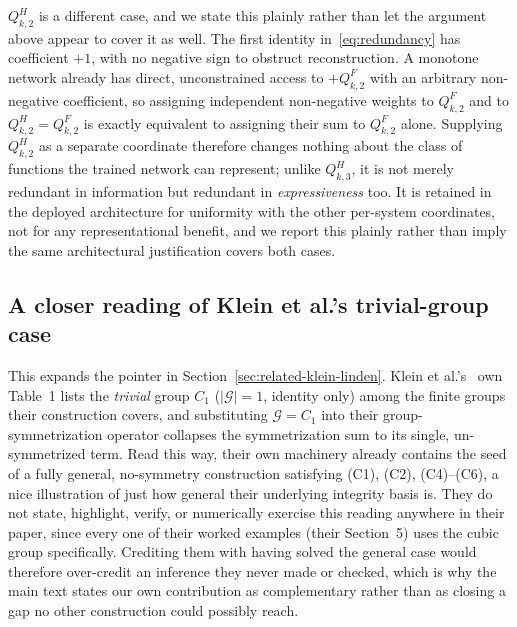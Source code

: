 \documentclass[10pt,a4paper]{article}
\begin{document}
$Q_{k,2}^H$ is a different case, and we state this plainly rather than
let the argument above appear to cover it as well. The first identity
in~\eqref{eq:redundancy} has coefficient $+1$, with no negative sign
to obstruct reconstruction. A monotone network already has direct,
unconstrained access to $+Q_{k,2}^F$ with an arbitrary non-negative
coefficient, so assigning independent non-negative weights to
$Q_{k,2}^F$ and to $Q_{k,2}^H=Q_{k,2}^F$ is exactly equivalent to
assigning their sum to $Q_{k,2}^F$ alone. Supplying $Q_{k,2}^H$ as a
separate coordinate therefore changes nothing about the class of
functions the trained network can represent; unlike $Q_{k,3}^H$, it
is not merely redundant in information but redundant in
\emph{expressiveness} too. It is retained in the deployed architecture
for uniformity with the other per-system coordinates, not for any
representational benefit, and we report this plainly rather than
imply the same architectural justification covers both cases.

\subsection{A closer reading of Klein et al.'s trivial-group case}
\label{app:klein-trivial}
This expands the pointer in Section~\ref{sec:related-klein-linden}.
Klein et al.'s~\cite{Klein2026} own Table~1 lists the \emph{trivial}
group $C_1$ ($|\mathcal G|=1$, identity only) among the finite groups
their construction covers, and substituting $\mathcal G=C_1$ into their
group-symmetrization operator collapses the symmetrization sum to its
single, un-symmetrized term. Read this way, their own machinery already
contains the seed of a fully general, no-symmetry construction
satisfying (C1), (C2), (C4)--(C6), a nice illustration of just how
general their underlying integrity basis is. They do not state,
highlight, verify, or numerically exercise this reading anywhere in
their paper, since every one of their worked examples (their Section~5) uses
the cubic group specifically. Crediting them with having solved the
general case would therefore over-credit an inference they never made
or checked, which is why the main text states our own contribution as
complementary rather than as closing a gap no other construction could
possibly reach.
\end{document}
